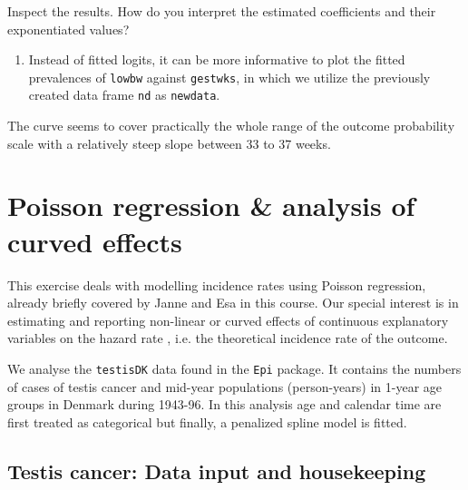 \documentclass[
]{book}
\newenvironment{Shaded}{\begin{snugshade}}{\end{snugshade}}
\newcommand{\AttributeTok}[1]{\textcolor[rgb]{0.13,0.29,0.53}{#1}}
\newcommand{\FunctionTok}[1]{\textcolor[rgb]{0.13,0.29,0.53}{\textbf{#1}}}
\newcommand{\NormalTok}[1]{#1}
\newcommand{\OtherTok}[1]{\textcolor[rgb]{0.56,0.35,0.01}{#1}}
\newcommand{\SpecialCharTok}[1]{\textcolor[rgb]{0.81,0.36,0.00}{\textbf{#1}}}
\newcommand{\StringTok}[1]{\textcolor[rgb]{0.31,0.60,0.02}{#1}}
\providecommand{\tightlist}{%
  \setlength{\itemsep}{0pt}\setlength{\parskip}{0pt}}
\begin{document}
Inspect the results. How do you interpret the estimated coefficients
and their exponentiated values?

\begin{enumerate}
\def\labelenumi{\arabic{enumi}.}
\setcounter{enumi}{5}
\tightlist
\item
  Instead of fitted logits, it can be more informative
  to plot the fitted prevalences of \texttt{lowbw} against \texttt{gestwks},
  in which we utilize the previously created data frame \texttt{nd}
  as \texttt{newdata}.
\end{enumerate}

\begin{Shaded}
\end{Shaded}

The curve seems to cover practically the whole range of
the outcome probability scale with a relatively
steep slope between 33 to 37 weeks.

\chapter{Poisson regression \& analysis of curved effects}\label{poisson-regression-analysis-of-curved-effects}

This exercise deals with modelling incidence rates using Poisson
regression, already briefly covered by Janne and Esa in this course. Our
special interest is in estimating and reporting non-linear or curved
effects of continuous explanatory variables on the hazard rate , i.e.
the theoretical incidence rate of the outcome.

We analyse the \texttt{testisDK} data found in the \texttt{Epi} package. It contains
the numbers of cases of testis cancer and mid-year populations
(person-years) in 1-year age groups in Denmark during 1943-96. In this
analysis age and calendar time are first treated as categorical but
finally, a penalized spline model is fitted.

\section{Testis cancer: Data input and housekeeping}\label{testis-cancer-data-input-and-housekeeping}
\end{document}
